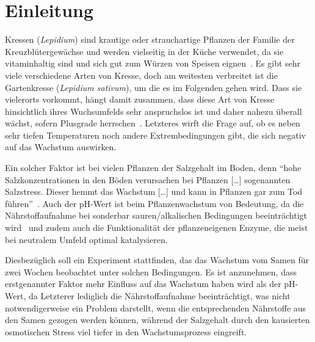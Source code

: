 \section{Einleitung} %
\label{sec:einleitung}
Kressen (\textit{Lepidium}) sind krautige oder strauchartige Pflanzen der Familie der Kreuzblütergewächse und werden vielseitig in der Küche verwendet, da sie vitaminhaltig sind und sich gut zum Würzen von Speisen eignen\ \cite[vgl.][]{web:meinschoenergarten}. Es gibt sehr viele verschiedene Arten von Kresse, doch am weitesten verbreitet ist die Gartenkresse (\textit{Lepidium sativum}), um die es im Folgenden gehen wird. Dass sie vielerorts vorkommt, hängt damit zusammen, dass diese Art von Kresse hinsichtlich ihres Wuchsumfelds sehr anspruchslos ist und daher nahezu überall wächst, sofern Plusgrade herrschen\ \cite[vgl.][]{web:meinschoenergarten}. Letzteres wirft die Frage auf, ob es neben sehr tiefen Temperaturen noch andere Extrembedingungen gibt, die sich negativ auf das Wachstum auswirken.\par
Ein solcher Faktor ist bei vielen Pflanzen der Salzgehalt im Boden, denn ``hohe Salzkonzentrationen in den Böden verursachen bei Pflanzen [\dots] sogenannten Salzstress. Dieser hemmt das Wachstum [\dots] und kann in Pflanzen gar zum Tod führen''\ \cite{web:salzstress}. Auch der pH-Wert ist beim Pflanzenwachstum von Bedeutung, da die Nährstoffaufnahme bei sonderbar sauren/alkalischen Bedingungen beeinträchtigt wird\ \cite[vgl.][]{web:phwert} und zudem auch die Funktionalität der pflanzeneigenen Enzyme, die meist bei neutralem Umfeld optimal katalysieren.\par
Diesbezüglich soll ein Experiment stattfinden, das das Wachstum vom Samen für zwei Wochen beobachtet unter solchen Bedingungen. Es ist anzunehmen, dass erstgenannter Faktor mehr Einfluss auf das Wachstum haben wird als der pH-Wert, da Letzterer lediglich die Nährstoffaufnahme beeinträchtigt, was nicht notwendigerweise ein Problem darstellt, wenn die entsprechenden Nährstoffe aus den Samen gezogen werden können, während der Salzgehalt durch den kausierten osmotischen Stress viel tiefer in den Wachstumsprozess eingreift.
